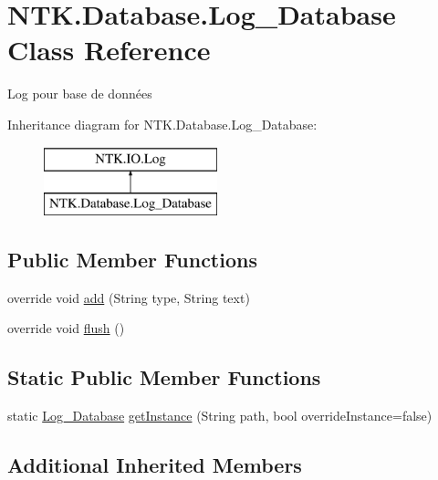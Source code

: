 \hypertarget{class_n_t_k_1_1_database_1_1_log___database}{}\section{N\+T\+K.\+Database.\+Log\+\_\+\+Database Class Reference}
\label{class_n_t_k_1_1_database_1_1_log___database}


Log pour base de données  


Inheritance diagram for N\+T\+K.\+Database.\+Log\+\_\+\+Database\+:\begin{figure}[H]
\begin{center}
\leavevmode
\includegraphics[height=2.000000cm]{d2/d00/class_n_t_k_1_1_database_1_1_log___database}
\end{center}
\end{figure}
\subsection*{Public Member Functions}
\begin{DoxyCompactItemize}
\item 
override void \mbox{\hyperlink{class_n_t_k_1_1_database_1_1_log___database_aad5f90e209def99a3e54c8a04417b26f}{add}} (String type, String text)
\item 
override void \mbox{\hyperlink{class_n_t_k_1_1_database_1_1_log___database_a4783f62069c0032c8ee979352853c1bb}{flush}} ()
\end{DoxyCompactItemize}
\subsection*{Static Public Member Functions}
\begin{DoxyCompactItemize}
\item 
static \mbox{\hyperlink{class_n_t_k_1_1_database_1_1_log___database}{Log\+\_\+\+Database}} \mbox{\hyperlink{class_n_t_k_1_1_database_1_1_log___database_af19bbcf4304e70748c3dc89555755542}{get\+Instance}} (String path, bool override\+Instance=false)
\end{DoxyCompactItemize}
\subsection*{Additional Inherited Members}


